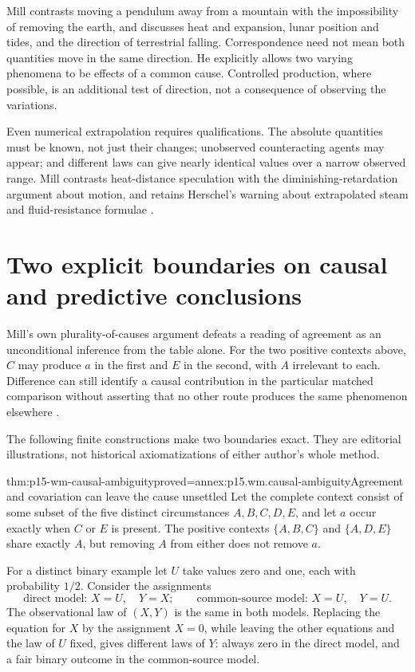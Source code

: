 Mill contrasts moving a pendulum away from a mountain with the
impossibility of removing the earth, and discusses heat and expansion,
lunar position and tides, and the direction of terrestrial falling.
Correspondence need not mean both quantities move in the same direction.
He explicitly allows two varying phenomena to be effects of a common
cause. Controlled production, where possible, is an additional test
of direction, not a consequence of observing the variations.

Even numerical extrapolation requires qualifications. The absolute
quantities must be known, not just their changes; unobserved counteracting
agents may appear; and different laws can give nearly identical values
over a narrow observed range. Mill contrasts heat-distance speculation
with the diminishing-retardation argument about motion, and retains
Herschel's warning about extrapolated steam and fluid-resistance formulae
\parencite[III.VIII.6--7 and note~136]{Mill1882SystemLogicPG}.

\section{Two explicit boundaries on causal and predictive conclusions}
\label{sec:p15-wm-boundaries}

Mill's own plurality-of-causes argument defeats a reading of agreement
as an unconditional inference from the table alone.
For the two positive contexts above, \(C\) may produce \(a\) in the
first and \(E\) in the second, with \(A\) irrelevant to each.
Difference can still identify a causal contribution in the particular
matched comparison without asserting that no other route produces
the same phenomenon elsewhere
\parencite[III.X.1--3]{Mill1882SystemLogicPG}.

The following finite constructions make two boundaries exact.
They are editorial illustrations, not historical axiomatizations of
either author's whole method.

\begin{hbtheorem}{thm:p15-wm-causal-ambiguity}{proved=annex:p15.wm.causal-ambiguity}{Agreement and covariation can leave the cause unsettled}
Let the complete context consist of some subset of the five distinct
circumstances \(A,B,C,D,E\), and let \(a\) occur exactly when \(C\)
or \(E\) is present. The positive contexts \(\{A,B,C\}\) and
\(\{A,D,E\}\) share exactly \(A\), but removing \(A\) from either
does not remove \(a\).

For a distinct binary example let \(U\) take values zero and one,
each with probability \(1/2\). Consider the assignments
\[
 \text{direct model: }X=U,\quad Y=X;
 \qquad
 \text{common-source model: }X=U,\quad Y=U.
\]
The observational law of \((X,Y)\) is the same in both models.
Replacing the equation for \(X\) by the assignment \(X=0\), while
leaving the other equations and the law of \(U\) fixed, gives
different laws of \(Y\): always zero in the direct model, and a
fair binary outcome in the common-source model.
\end{hbtheorem}

